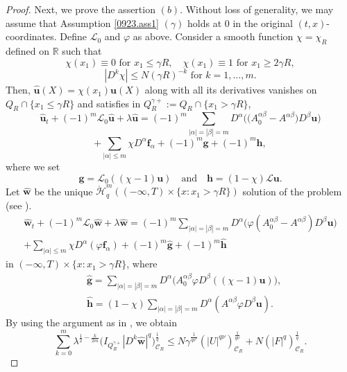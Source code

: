 \documentclass[reqno]{amsart}
\numberwithin{equation}{section}
\theoremstyle{plain}
\theoremstyle{definition}
\theoremstyle{remark}
\begin{document}
\begin{proof}
Next, we prove the assertion $(b)$.
Without loss of generality, we may assume that Assumption \ref{0923.ass1} $(\gamma)$ holds at $0$ in the original $(t,x)$-coordinates.
Define ${\mathcal{L}}_0$ and $\varphi$ as above.
Consider a smooth function $\chi=\chi_R$ defined on ${\mathbb{R}}$ such that 
$$
\chi(x_1)\equiv 0 \text{ for } x_1\le \gamma R, \quad \chi(x_1)\equiv 1 \text{ for } x_1\ge 2\gamma R,
$$
$$
|D^k\chi| \le N(\gamma R)^{-k} \text{ for } k=1,\ldots, m.
$$
Then, $\hat{{\boldsymbol{u}}}(X)=\chi(x_1){\boldsymbol{u}}(X)$ along with all its derivatives vanishes on $Q_R\cap \{x_1\le \gamma R\}$ and satisfies in $Q_R^{\gamma+}:=Q_R\cap \{ x_1>\gamma R\}$,
$$
\hat{{\boldsymbol{u}}}_t+(-1)^m{\mathcal{L}}_0\hat{{\boldsymbol{u}}}+\lambda\hat{{\boldsymbol{u}}}=(-1)^m \sum_{|\alpha|=|\beta|=m}D^\alpha\big(\big(A_0^{\alpha\beta}-A^{\alpha\beta})D^\beta{\boldsymbol{u}}\big)
$$
$$
+\sum_{|\alpha| \le m}\chi D^\alpha{\boldsymbol{f}}_\alpha+(-1)^m{\boldsymbol{g}}+(-1)^m {\boldsymbol{h}},
$$
where we set
\[
{\boldsymbol{g}}={\mathcal{L}}_0((\chi-1){\boldsymbol{u}}) \quad \text{and}\quad {\boldsymbol{h}}=(1-\chi){\mathcal{L}}{\boldsymbol{u}}.
\]
Let $\hat{{\boldsymbol{w}}}$ be the unique $\mathring{\mathcal{H}}^m_q((-\infty,T) \times \{x:x_1>\gamma R\})$  solution of the problem  (see \cite[Theorem 3]{MR2771670}).
\begin{multline*}		
\hat{{\boldsymbol{w}}}_t+(-1)^m {\mathcal{L}}_0\hat{{\boldsymbol{w}}}+\lambda \hat{{\boldsymbol{w}}}=(-1)^m\sum_{|\alpha|=|\beta|=m}D^\alpha\big(\varphi(A_0^{\alpha\beta}-A^{\alpha\beta})D^\beta{\boldsymbol{u}}\big)\\
+\sum_{|\alpha| \le m}\chi D^\alpha(\varphi {\boldsymbol{f}}_\alpha)+(-1)^m\hat{{\boldsymbol{g}}}+(-1)^m\hat{{\boldsymbol{h}}}
\end{multline*}
in $(-\infty,T)\times \{x:x_1>\gamma R\}$, where 
\begin{align*}
&\hat{{\boldsymbol{g}}}=\sum_{|\alpha|=|\beta|=m}D^\alpha\big(A_0^{\alpha\beta}\varphi D^\beta((\chi-1){\boldsymbol{u}})\big),\\
&\hat{{\boldsymbol{h}}}=(1-\chi)\sum_{|\alpha|=|\beta|=m}D^\alpha(A^{\alpha\beta}\varphi D^\beta {\boldsymbol{u}}).
\end{align*}
By using the argument as in \cite[Lemma A.1]{arXiv:1603.07844v1}, we obtain 
\begin{equation}		\label{1007@eq1}
\sum_{k=0}^m \lambda^{\frac{1}{2}-\frac{k}{2m}}\big(I_{Q^{\gamma+}_R}|D^k\hat{{\boldsymbol{w}}}|^q\big)^{\frac{1}{q}}_{{\mathcal{C}}_R}\le N\gamma^{\frac{1}{q\nu'}}\left(|U|^{q\nu}\right)^{\frac{1}{q\nu}}_{{\mathcal{C}}_R}+N(|F|^q)^{\frac{1}{q}}_{{\mathcal{C}}_R}.

\end{equation}
\end{proof}
\end{document}

